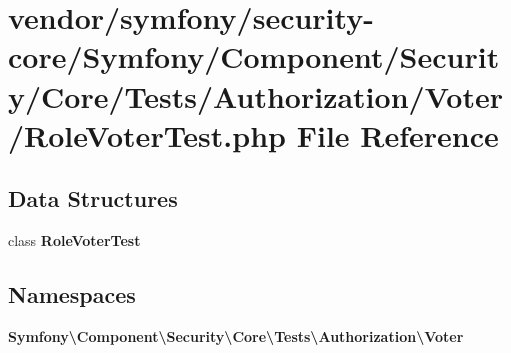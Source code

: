 \section{vendor/symfony/security-\/core/\+Symfony/\+Component/\+Security/\+Core/\+Tests/\+Authorization/\+Voter/\+Role\+Voter\+Test.php File Reference}
\label{_role_voter_test_8php}
\subsection*{Data Structures}
\begin{DoxyCompactItemize}
\item 
class {\bf Role\+Voter\+Test}
\end{DoxyCompactItemize}
\subsection*{Namespaces}
\begin{DoxyCompactItemize}
\item 
 {\bf Symfony\textbackslash{}\+Component\textbackslash{}\+Security\textbackslash{}\+Core\textbackslash{}\+Tests\textbackslash{}\+Authorization\textbackslash{}\+Voter}
\end{DoxyCompactItemize}
